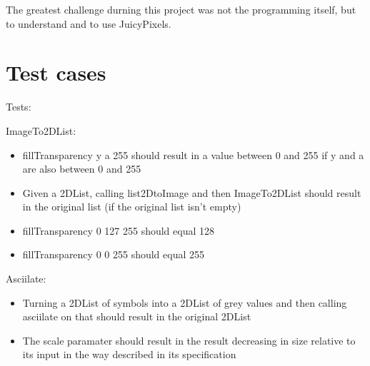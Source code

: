 \documentclass[12pt, a4paper]{article}
\newcounter{appendixpage}
\newenvironment{appendices}{
	\setcounter{appendixpage}{\arabic{page}}
	\stepcounter{appendixpage}
}{
}
\begin{document}
		The greatest challenge durning this project was not the programming itself, but to understand and to use JuicyPixels.



	\section{Test cases}


		Tests:

		ImageTo2DList:
		\begin{itemize}
			\item{fillTransparency y a 255 should result in a value
			      between 0 and 255 if y and a are also between 0
						and 255}
			\item{Given a 2DList, calling list2DtoImage and then
			      ImageTo2DList should result in the original list
						(if the original list isn't empty)}
			\item{fillTransparency 0 127 255 should equal 128}
			\item{fillTransparency 0 0 255 should equal 255}
		\end{itemize}

		Asciilate:
		\begin{itemize}
			\item{Turning a 2DList of symbols into a 2DList of
			      grey values and then calling asciilate on that
						should result in the original 2DList}
			\item{The scale paramater should result in the result
			      decreasing in size relative to its input in the
						way described in its specification}
			\end{itemize}



	\appendix
\end{document}
